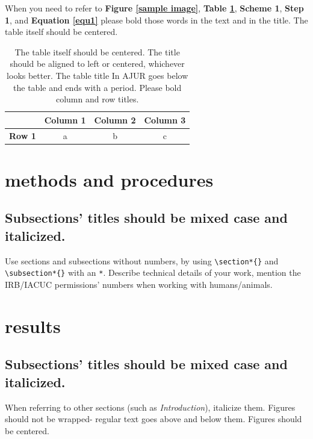 \documentclass[10pt]{article}
\begin{document}
When you need to refer to \textbf{Figure \ref{sample image}}, \textbf{Table \ref{sample table}}, \textbf{Scheme 1}, \textbf{Step 1}, and \textbf{Equation \ref{equ1}} please bold those words in the text and in the title. The table itself should be centered.

\begin{table}[htp!]
\begin{center}
\begin{tabular}{ | c | c | c | c | }
\hline
 & \textbf{Column 1} & \textbf{Column 2} & \textbf{Column 3} \\ 
 \hline
 \textbf{Row 1} & a & b & c \\  
 \hline
\end{tabular}
\caption{The table itself should be centered. The title should be aligned to left or centered, whichever looks better. The table title In AJUR goes below the table and ends with a period. Please bold column and row titles.}
\label{sample table}
\end{center}
\end{table}

\section*{methods and procedures}

\subsection*{Subsections' titles should be mixed case and italicized.}
Use sections and subsections without numbers, by using \verb+\section*{}+ and \verb+\subsection*{}+ with an \verb+*+. Describe technical details of your work,\cite{journal,chapters} mention the IRB/IACUC permissions' numbers when working with humans/animals.

\section*{results}
\subsection*{Subsections' titles should be mixed case and italicized.}
When referring to other sections (such as \textit{Introduction}), italicize them. Figures should not be wrapped- regular text goes above and below them. Figures should be centered.
\end{document}
